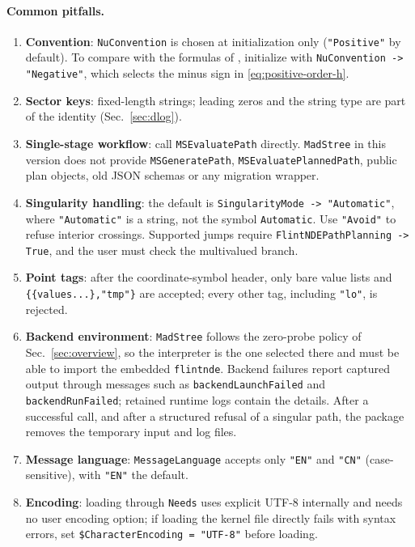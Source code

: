 \documentclass[11pt,a4paper]{article}
\begin{document}
\paragraph{Common pitfalls.}
\label{sec:pitfalls}

\begin{enumerate}
  \item \textbf{Convention}: \texttt{NuConvention} is chosen at initialization only
        (\texttt{"Positive"} by default). To compare with the formulas of
        \cite{Chen:2024glu}, initialize with \texttt{NuConvention -> "Negative"}, which selects
        the minus sign in \eqref{eq:positive-order-h}.
  \item \textbf{Sector keys}: fixed-length strings; leading zeros and the string type are part of
        the identity (Sec.~\ref{sec:dlog}).
  \item \textbf{Single-stage workflow}: call \texttt{MSEvaluatePath} directly. \texttt{MadStree} in this version does not
        provide \texttt{MSGeneratePath}, \texttt{MSEvaluatePlannedPath}, public plan objects, old JSON
        schemas or any migration wrapper.
  \item \textbf{Singularity handling}: the default is \texttt{SingularityMode -> "Automatic"},
        where \texttt{"Automatic"} is a string, not the symbol \texttt{Automatic}.
        Use \texttt{"Avoid"} to refuse interior crossings. Supported jumps require
        \texttt{FlintNDEPathPlanning -> True}, and the user must check the multivalued branch.
  \item \textbf{Point tags}: after the coordinate-symbol header, only bare value lists and
        \texttt{\{\{values...\},"tmp"\}} are accepted; every other tag, including
        \texttt{"lo"}, is rejected.
  \item \textbf{Backend environment}: \texttt{MadStree} follows the zero-probe policy of
        Sec.~\ref{sec:overview}, so the interpreter is the one selected there and must be able to
        import the embedded \texttt{flintnde}. Backend failures report captured output through
        messages such as \texttt{backendLaunchFailed} and \texttt{backendRunFailed}; retained runtime
        logs contain the details. After a successful call, and after a structured refusal of a
        singular path, the package removes the temporary input and log files.
  \item \textbf{Message language}: \texttt{MessageLanguage} accepts only \texttt{"EN"} and
        \texttt{"CN"} (case-sensitive), with \texttt{"EN"} the default.
  \item \textbf{Encoding}: loading through \texttt{Needs} uses explicit UTF-8 internally and needs
        no user encoding option; if loading the kernel file directly fails with syntax errors, set
        \texttt{\$CharacterEncoding = "UTF-8"} before loading.
\end{enumerate}
\end{document}

